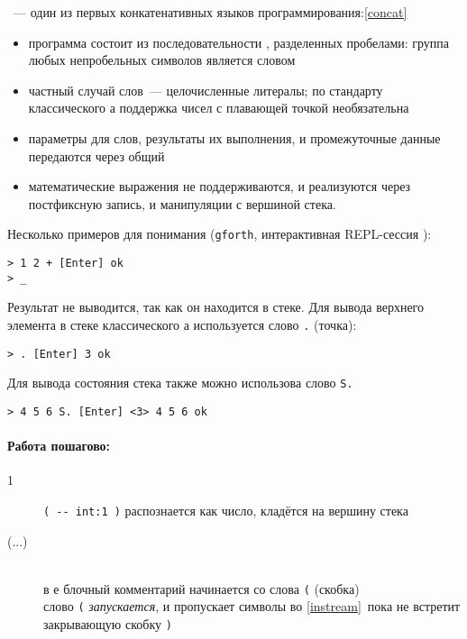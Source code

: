 \clearpage
{}\label{rstack}\secdown

\noindent
\F{}\ --- один из первых конкатенативных языков
программирования:\ref{concat}
\begin{itemize}[nosep]
    \item программа состоит из последовательности , разделенных
    пробелами: группа любых непробельных
    символов является словом
    \item частный случай слов\ --- целочисленные литералы; по
    стандарту классического \F а поддержка чисел с плавающей точкой необязательна
    \item параметры для слов, результаты их выполнения, и промежуточные данные
    передаются через общий 
    \item математические выражения не поддерживаются, и реализуются через
    постфиксную запись, и манипуляции с вершиной стека.
\end{itemize}

Несколько примеров для понимания (\verb|gforth|, интерактивная
REPL-сессия ):

\begin{verbatim}
> 1 2 + [Enter] ok
> _
\end{verbatim}

Результат не выводится, так как он находится в стеке. Для вывода верхнего
элемента в стеке классического \F а используется слово \verb|.| (точка):
\begin{verbatim}
> . [Enter] 3 ok
\end{verbatim}

Для вывода состояния стека также можно использова слово \verb|S.|
\begin{verbatim}
> 4 5 6 S. [Enter] <3> 4 5 6 ok
\end{verbatim}
    

\clearpage
\paragraph{Работа пошагово:}
\begin{description}
    \item[1] \verb|( -- int:1 )| распознается как число, кладётся на вершину стека
    \item[(...)] \\
    в \F е блочный комментарий начинается со слова \verb|(| (скобка)\\
    слово \verb|(| \emph{запускается}, и пропускает символы во \ref{instream}\ пока не встретит закрывающую скобку \verb|)|
\end{description}
    

